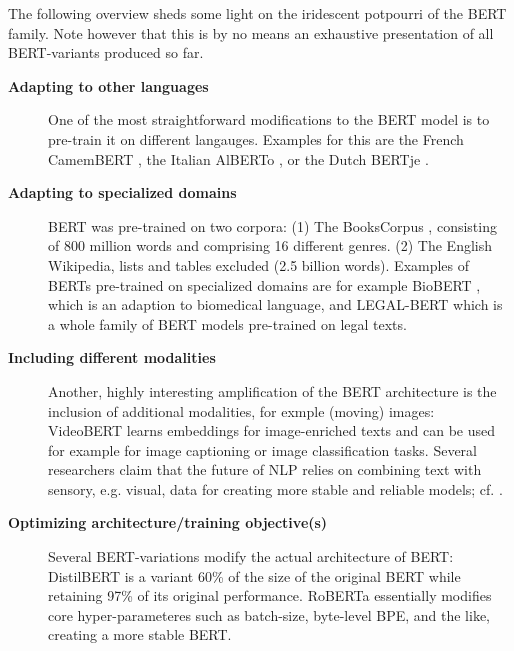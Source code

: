 The following overview sheds some light on the iridescent potpourri of the BERT
family.
Note however that this is by no means an exhaustive presentation of all BERT-variants produced so far.


\begin{description}
  \item[\textbf{Adapting to other languages}] One of the most straightforward modifications to the BERT model is to pre-train it on different langauges. Examples for this are the French CamemBERT \cite{martin2019camembert}, the Italian AlBERTo \cite{polignano2019alberto}, or the Dutch BERTje \cite{de2019bertje}.
  \item[\textbf{Adapting to specialized domains}] BERT was pre-trained on two corpora: (1) The BooksCorpus \citep{zhu2015aligning}, consisting of 800 million words and comprising 16 different genres. (2) The English Wikipedia, lists and tables excluded (2.5 billion words).
  Examples of BERTs pre-trained on specialized domains are for example BioBERT \cite{lee2020biobert}, which  is an adaption to biomedical language, and LEGAL-BERT \cite{chalkidis2020legalbert} which is a whole family of BERT models pre-trained on legal texts.
  \item[\textbf{Including different modalities}] Another, highly interesting amplification of the BERT architecture is the inclusion of additional modalities, for exmple (moving) images: VideoBERT \cite{sun2019videobert} learns embeddings for image-enriched texts and can be used for example for image captioning or image classification tasks.
  Several researchers claim that the future of NLP relies on combining text with sensory, e.g. visual, data for creating more stable and reliable models; cf. \citep{bisk2020experience, bender2021dangers}.
  \item[\textbf{Optimizing architecture/training objective(s)}] Several BERT-variations modify the actual architecture of BERT:  DistilBERT \cite{sanh2019distilbert} is a variant 60\% of the size of the original BERT while retaining 97\% of its original performance.
  RoBERTa \cite{liu2019roberta} essentially modifies core hyper-parameteres such as batch-size, byte-level BPE, and the like, creating a more stable BERT.

\end{description}
